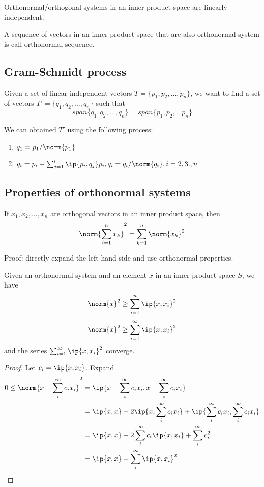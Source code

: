 \begin{refsection}
\begin{theorem}
	Orthonormal/orthogonal systems in an inner product space are linearly independent.
\end{theorem}

\begin{definition}
	\cite[101]{debnath2005hilbert} A sequence of vectors in an inner product space that are also orthonormal system is call orthonormal sequence.
\end{definition}


\subsection{Gram-Schmidt process}

\begin{mdframed}
	Given a set of linear independent vectors $T=\{p_1,p_2,...,p_n\}$, we want to find a set of vectors $T'=\{q_1,q_2,...,q_n\}$ such that
	$$span\{q_1,q_2,...,q_n\}=span\{p_1,p_2,...p_n\}$$
	
	We can obtained $T'$ using the following process:
	\begin{enumerate}
		\item $q_1 = p_1/\norm{p_1}$
		\item $q_i = p_i - \sum_{j=1}^i \ip{p_i,q_j} p_i, q_i = q_i/\norm{q_i},i=2,3.,n $
	\end{enumerate}
\end{mdframed}


\subsection{Properties of orthonormal systems}
\begin{theorem}
	If $x_1,x_2,...,x_n$ are orthogonal vectors in an inner product space, then
	$$\norm{\sum_{i=1}^n x_k}^2 = \sum_{k=1}^n \norm{x_k}^2$$
\end{theorem}
Proof: directly expand the left hand side and use orthonormal properties. 


\begin{theorem}
	\cite[305]{johnsonbaugh2010foundations}\cite[106]{debnath2005hilbert} Given an orthonormal system and an element $x$ in an inner product space $S$, we have
	$$\norm{x}^2 \geq \sum_{i=1}^n \ip{x,x_i}^2$$
	$$\norm{x}^2 \geq \sum_{i=1}^\infty \ip{x,x_i}^2$$
	and the series $\sum_{i=1}^\infty \ip{x,x_i}^2$ converge. 
\end{theorem}
\begin{proof}
	Let $c_i = \ip{x, x_i}$. Expand 
	\begin{align*}
	0 \leq \norm{x-\sum_i^\infty c_i x_i}^2 &= \ip{x-\sum_i^\infty c_i x_i,x-\sum_i^\infty c_i x_i}\\
	&= \ip{x,x}-2\ip{x,\sum_i^\infty c_i x_i} + \ip{\sum_i^\infty c_i x_i,\sum_i^\infty c_i x_i}\\
	&= \ip{x,x}-2\sum_i^\infty c_i \ip{x, x_i} + \sum_i^\infty c_i^2 \\
	&=\ip{x,x} - \sum_i^\infty \ip{x, x_i}^2
	\end{align*}
	

\end{proof}
\end{refsection}
